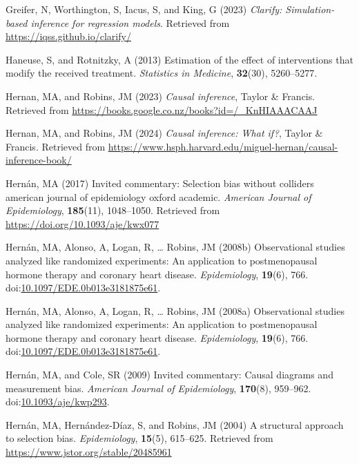 \documentclass[
  single column]{article}
\newlength{\cslhangindent}
\newenvironment{CSLReferences}[2] %
 {\begin{list}{}{%
  \setlength{\itemindent}{0pt}
  \setlength{\leftmargin}{0pt}
  \setlength{\parsep}{0pt}
  \ifodd #1
   \setlength{\leftmargin}{\cslhangindent}
   \setlength{\itemindent}{-1\cslhangindent}
  \fi
  \setlength{\itemsep}{#2\baselineskip}}}
 {\end{list}}
\begin{document}
\begin{CSLReferences}{1}{0}
Greifer, N, Worthington, S, Iacus, S, and King, G (2023) \emph{Clarify:
Simulation-based inference for regression models}. Retrieved from
\url{https://iqss.github.io/clarify/}

Haneuse, S, and Rotnitzky, A (2013) Estimation of the effect of
interventions that modify the received treatment. \emph{Statistics in
Medicine}, \textbf{32}(30), 5260--5277.

Hernan, MA, and Robins, JM (2023) \emph{Causal inference}, Taylor \&
Francis. Retrieved from
\url{https://books.google.co.nz/books?id=/_KnHIAAACAAJ}

Hernan, MA, and Robins, JM (2024) \emph{Causal inference: What if?},
Taylor \& Francis. Retrieved from
\url{https://www.hsph.harvard.edu/miguel-hernan/causal-inference-book/}

Hernán, MA (2017) Invited commentary: Selection bias without colliders
\textbar{} american journal of epidemiology \textbar{} oxford academic.
\emph{American Journal of Epidemiology}, \textbf{185}(11), 1048--1050.
Retrieved from \url{https://doi.org/10.1093/aje/kwx077}

Hernán, MA, Alonso, A, Logan, R, \ldots{} Robins, JM (2008b)
Observational studies analyzed like randomized experiments: An
application to postmenopausal hormone therapy and coronary heart
disease. \emph{Epidemiology}, \textbf{19}(6), 766.
doi:\href{https://doi.org/10.1097/EDE.0b013e3181875e61}{10.1097/EDE.0b013e3181875e61}.

Hernán, MA, Alonso, A, Logan, R, \ldots{} Robins, JM (2008a)
Observational studies analyzed like randomized experiments: An
application to postmenopausal hormone therapy and coronary heart
disease. \emph{Epidemiology}, \textbf{19}(6), 766.
doi:\href{https://doi.org/10.1097/EDE.0b013e3181875e61}{10.1097/EDE.0b013e3181875e61}.

Hernán, MA, and Cole, SR (2009) Invited commentary: Causal diagrams and
measurement bias. \emph{American Journal of Epidemiology},
\textbf{170}(8), 959--962.
doi:\href{https://doi.org/10.1093/aje/kwp293}{10.1093/aje/kwp293}.

Hernán, MA, Hernández-Díaz, S, and Robins, JM (2004) A structural
approach to selection bias. \emph{Epidemiology}, \textbf{15}(5),
615--625. Retrieved from \url{https://www.jstor.org/stable/20485961}


\end{CSLReferences}
\end{document}
